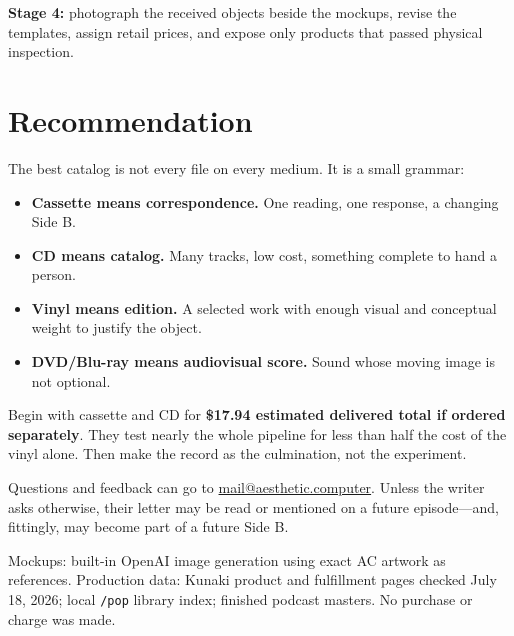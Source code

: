 \documentclass[11pt]{article}
\begin{document}
\textbf{Stage 4:} photograph the received objects beside the mockups, revise the templates, assign retail prices, and expose only products that passed physical inspection.

\section*{Recommendation}

The best catalog is not every file on every medium. It is a small grammar:

\begin{itemize}
  \item \textbf{Cassette means correspondence.} One reading, one response, a changing Side B.
  \item \textbf{CD means catalog.} Many tracks, low cost, something complete to hand a person.
  \item \textbf{Vinyl means edition.} A selected work with enough visual and conceptual weight to justify the object.
  \item \textbf{DVD/Blu-ray means audiovisual score.} Sound whose moving image is not optional.
\end{itemize}

Begin with cassette and CD for \textbf{\$17.94 estimated delivered total if ordered separately}. They test nearly the whole pipeline for less than half the cost of the vinyl alone. Then make the record as the culmination, not the experiment.

Questions and feedback can go to \href{mailto:mail@aesthetic.computer}{mail@aesthetic.computer}. Unless the writer asks otherwise, their letter may be read or mentioned on a future episode---and, fittingly, may become part of a future Side B.

\vfill
\textcolor{acgray}{Mockups: built-in OpenAI image generation using exact AC artwork as references. Production data: Kunaki product and fulfillment pages checked July 18, 2026; local \texttt{/pop} library index; finished podcast masters. No purchase or charge was made.}
\end{document}
